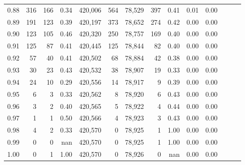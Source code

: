 \begin{tabular}{rrrrrrrrrrrrrr}
0.88 &     316 &    166 &  0.34 &  420,006 &      564 &  78,529 &     397 &  0.41 &  0.01 &      0.00 \\
0.89 &     191 &    123 &  0.39 &  420,197 &      373 &  78,652 &     274 &  0.42 &  0.00 &      0.00 \\
0.90 &     123 &    105 &  0.46 &  420,320 &      250 &  78,757 &     169 &  0.40 &  0.00 &      0.00 \\
0.91 &     125 &     87 &  0.41 &  420,445 &      125 &  78,844 &      82 &  0.40 &  0.00 &      0.00 \\
0.92 &      57 &     40 &  0.41 &  420,502 &       68 &  78,884 &      42 &  0.38 &  0.00 &      0.00 \\
0.93 &      30 &     23 &  0.43 &  420,532 &       38 &  78,907 &      19 &  0.33 &  0.00 &      0.00 \\
0.94 &      24 &     10 &  0.29 &  420,556 &       14 &  78,917 &       9 &  0.39 &  0.00 &      0.00 \\
0.95 &       6 &      3 &  0.33 &  420,562 &        8 &  78,920 &       6 &  0.43 &  0.00 &      0.00 \\
0.96 &       3 &      2 &  0.40 &  420,565 &        5 &  78,922 &       4 &  0.44 &  0.00 &      0.00 \\
0.97 &       1 &      1 &  0.50 &  420,566 &        4 &  78,923 &       3 &  0.43 &  0.00 &      0.00 \\
0.98 &       4 &      2 &  0.33 &  420,570 &        0 &  78,925 &       1 &  1.00 &  0.00 &      0.00 \\
0.99 &       0 &      0 &   nan &  420,570 &        0 &  78,925 &       1 &  1.00 &  0.00 &      0.00 \\
1.00 &       0 &      1 &  1.00 &  420,570 &        0 &  78,926 &       0 &   nan &  0.00 &      0.00 \\
\bottomrule
\end{tabular}
